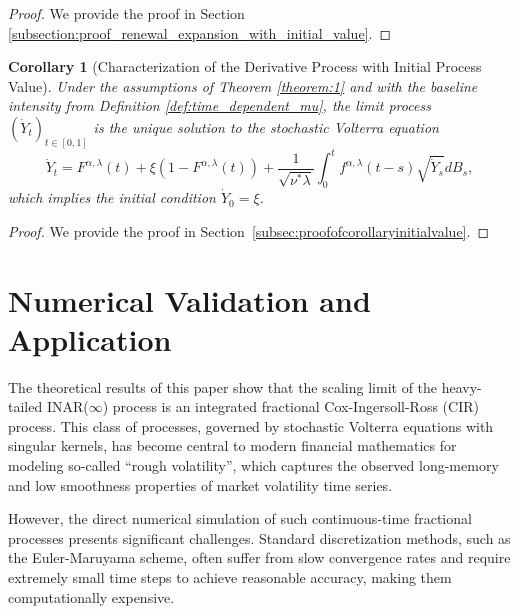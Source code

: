\documentclass[letterpaper]{article}
\numberwithin{equation}{section}
\newtheorem{corollary}[theorem]{Corollary}
\theoremstyle{definition}
\theoremstyle{remark}
\begin{document}
\begin{proof}
    We provide the proof in Section \ref{subsection:proof_renewal_expansion_with_initial_value}.
\end{proof}

\begin{corollary}[Characterization of the Derivative Process with Initial Process Value]\label{cor:initial_value}
  Under the assumptions of Theorem \ref{theorem:1} and with the baseline intensity from Definition \ref{def:time_dependent_mu}, the limit process $(\dot{Y}_t)_{t\in[0,1]}$ is the unique solution to the stochastic Volterra equation
  \begin{equation}\label{eq:sve_with_initial}
    \dot{Y}_t=F^{\alpha,\lambda}(t)+\xi\left(1-F^{\alpha,\lambda}(t)\right)+\frac1{\sqrt{\nu^*\lambda}}\int_0^tf^{\alpha,\lambda}(t-s)\sqrt{\dot{Y}_s}dB_s,
  \end{equation}
  which implies the initial condition $\dot{Y}_0 = \xi$.
\end{corollary}

\begin{proof}
  We provide the proof in Section~\ref{subsec:proofofcorollaryinitialvalue}. 
\end{proof}
\section{Numerical Validation and Application}
\label{sec:numerical_validation}


The theoretical results of this paper show that the scaling limit of the heavy-tailed INAR($\infty$) process is an integrated fractional Cox-Ingersoll-Ross (CIR) process. This class of processes, governed by stochastic Volterra equations with singular kernels, has become central to modern financial mathematics for modeling so-called ``rough volatility'', which captures the observed long-memory and low smoothness properties of market volatility time series.

However, the direct numerical simulation of such continuous-time fractional processes presents significant challenges. Standard discretization methods, such as the Euler-Maruyama scheme, often suffer from slow convergence rates and require extremely small time steps to achieve reasonable accuracy, making them computationally expensive.
\end{document}
